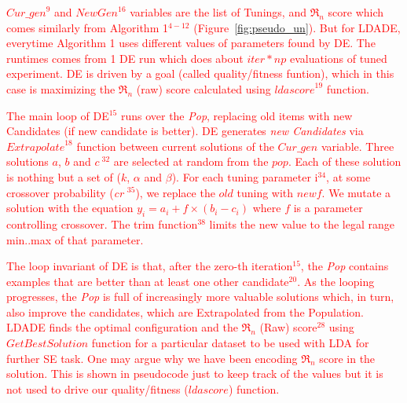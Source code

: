 \documentclass[twocolumn,5p,sort&compress]{elsarticle}
\newcommand{\fig}[1]{Figure~\ref{fig:#1}}
\theoremstyle{break}
\begin{document}


\textcolor{red}{$\mathit{Cur\_gen}^{9}$ and $\mathit{NewGen}^{16}$ variables are the list of Tunings, and $\Re_n$ score 
which comes similarly from Algorithm 1$^{4-12}$ (\fig{pseudo_un}). But for LDADE, everytime Algorithm 1 uses different values of parameters found by DE. The runtimes comes from 1 DE run which does about $\mathit{iter} * np$ evaluations of tuned experiment. DE is driven by a goal (called quality/fitness funtion), which in this case is maximizing the $\Re_n$ (raw) score calculated using  $\mathit{ldascore}^{19}$ function.}

\textcolor{red}{The main loop of DE$^{15}$ runs over the \textit{Pop}, replacing old items with new Candidates (if new candidate is better).
DE generates \textit{new Candidates} via 
$\mathit{Extrapolate}^{18}$ function between current solutions of the $\mathit{Cur\_gen}$ variable. Three solutions $a$, $b$ and $c\ ^{32}$ are
selected at random from the $\mathit{pop}$. Each of these solution is nothing but a set of ($k$, $\alpha$ and $\beta$). For each tuning parameter i$^{34}$, at some crossover probability (\textit{cr} $^{35}$), we
replace the $\mathit{old}$ tuning with $\mathit{newf}$. We mutate a solution with the equation $y_i = a_i + f \times (b_i - c_i)$ where $f$ is a
parameter controlling crossover. The trim function$^{38}$ limits the new value
to the legal range min..max of that parameter.}

\textcolor{red}{The loop invariant of DE is that, after the zero-th iteration$^{15}$, the \textit{Pop}
contains examples that are better than at least one other candidate$^{20}$.
As the looping progresses, the \textit{Pop} is full of increasingly more valuable solutions
which, in turn, also improve the candidates, which are Extrapolated from the Population. LDADE finds the optimal configuration and the $\Re_n$ (Raw) score$^{28}$ using $GetBestSolution$ function for a particular dataset to be used with LDA for further SE task. One may argue why we have been encoding $\Re_n$ score in the solution. This is shown in pseudocode just to keep track of the values but it is not used to drive our quality/fitness ($ldascore$) function.}
\end{document}
